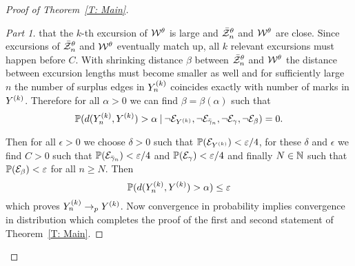 \begin{proof}[Proof of Theorem~\ref{T: Main}]
\begin{proof}[Part 1]
	that the $k$-th excursion of $\mathcal{W}^{\theta}$ is large and $\bar{\mathcal{Z}}^{\theta}_n$ and $\mathcal{W}^{\theta}$ are close.
	Since excursions of $\bar{\mathcal{Z}}^{\theta}_n$ and $\mathcal{W}^{\theta}$ eventually match up, 
	all $k$ relevant excursions must happen before $C$.
	With shrinking distance $\beta$ between $\bar{\mathcal{Z}}^{\theta}_n$ and $\mathcal{W}^{\theta}$ the distance between excursion lengths must become smaller as well
	and for sufficiently large $n$ the number of surplus edges in $Y_n^{(k)}$ coincides exactly with number of marks in $Y^{(k)}$.
	Therefore for all $\alpha > 0$ we can find $\beta = \beta(\alpha)$ such that
	\begin{equation*}
		\mathbb{P}( d(Y_n^{(k)}, Y^{(k)}) > \alpha \: | \: \neg\mathcal{E}_{Y^{(k)}}, \neg\mathcal{E}_{\bar{\gamma}_n}, \neg\mathcal{E}_{\gamma}, \neg\mathcal{E}_{\beta}) = 0.
	\end{equation*}
	
	Then for all $\epsilon > 0$ we choose $\delta > 0$ such that $\mathbb{P}(\mathcal{E}_{Y^{(k)}}) < \varepsilon / 4$,
	for these $\delta$ and $\epsilon$ we find $C > 0$ such that $\mathbb{P}(\mathcal{E}_{\bar{\gamma}_n}) < \varepsilon / 4$ and $\mathbb{P}(\mathcal{E}_{\gamma}) < \varepsilon / 4$
	and finally $N \in \mathbb{N}$ such that $\mathbb{P}(\mathcal{E}_{\beta}) < \varepsilon$ for all $n \geq N$.
	Then
	\begin{equation*}
		\mathbb{P}( d(Y_n^{(k)}, Y^{(k)}) > \alpha) \leq \varepsilon
	\end{equation*}
	which proves $Y_n^{(k)} \rightarrow_p Y^{(k)}$.
	Now convergence in probability implies convergence in distribution which completes the proof of the first and second statement of Theorem~\ref{T: Main}.
	\end{proof}




\end{proof}
